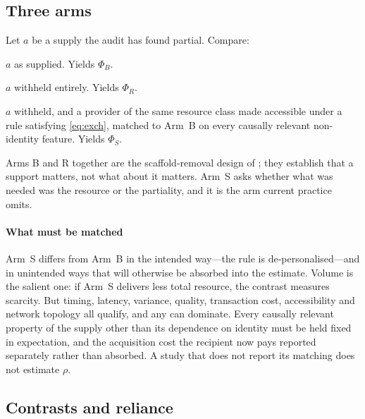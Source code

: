 \documentclass[review,3p,times]{elsarticle}
\begin{document}
\subsection{Three arms}

Let $a$ be a supply the audit has found partial. Compare:

\begin{description}[leftmargin=*,style=nextline]
\item[Arm B (baseline).] $a$ as supplied. Yields $\Phi_B$.
\item[Arm R (removal).] $a$ withheld entirely. Yields $\Phi_R$.
\item[Arm S (matched exchangeable substitution).] $a$ withheld, and a
provider of the same resource class made accessible under a rule satisfying
\eqref{eq:exch}, matched to Arm~B on every causally relevant non-identity
feature. Yields $\Phi_S$.
\end{description}

Arms B and R together are the scaffold-removal design of
\citet{doulcier2024}; they establish that a support matters, not what about
it matters. Arm~S asks whether what was needed was the resource or the
partiality, and it is the arm current practice omits.

\paragraph{What must be matched}
Arm~S differs from Arm~B in the intended way---the rule is
de-personalised---and in unintended ways that will otherwise be absorbed
into the estimate. Volume is the salient one: if Arm~S delivers less total
resource, the contrast measures scarcity. But timing, latency, variance,
quality, transaction cost, accessibility and network topology all qualify,
and any can dominate. Every causally relevant property of the supply other
than its dependence on identity must be held fixed in expectation, and the
acquisition cost the recipient now pays reported separately rather than
absorbed. A study that does not report its matching does not estimate
$\rho$.

\subsection{Contrasts and reliance}
\end{document}
